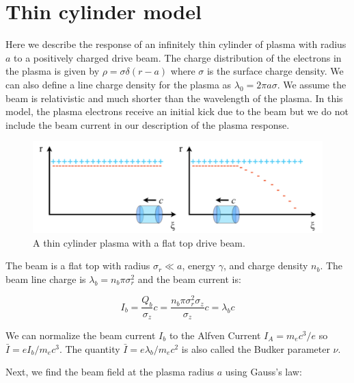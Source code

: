 \documentclass[aps,prl,preprint,groupedaddress]{revtex4-1}
\begin{document}
\section{Thin cylinder model}

Here we describe the response of an infinitely thin cylinder of plasma with radius $a$ to a positively charged drive beam. The charge distribution of the electrons in the plasma is given by $\rho = \sigma \delta(r-a)$ where $\sigma$ is the surface charge density. We can also define a line charge density for the plasma as $\lambda_0 = 2\pi a \sigma$. We assume the beam is relativistic and much shorter than the wavelength of the plasma. In this model, the plasma electrons receive an initial kick due to the beam but we do not include the beam current in our description of the plasma response. 


\begin{figure}[ht]\label{fig:thin_cyl}
  \centering
    \includegraphics[width=150mm]{./figures/thin_cyl.pdf}
      \caption{A thin cylinder plasma with a flat top drive beam.}
\end{figure}

The beam is a flat top with radius $\sigma_r \ll a$, energy $\gamma$, and charge density $n_b$. The beam line charge is $\lambda_b = n_b \pi \sigma_r^2$ and the beam current is:

\begin{equation}\label{eq:I_beam}
I_b = \frac{Q_b}{\sigma_z}c = \frac{n_b \pi \sigma_r^2 \sigma_z}{\sigma_z}c = \lambda_b c
\end{equation}

We can normalize the beam current $I_b$ to the Alfven Current $I_A = m_e c^3/e$ so $\bar{I} = e I_b /m_e c^3$. The quantity $\bar{I} = e \lambda_b/m_e c^2$ is also called the Budker parameter $\nu$. 

Next, we find the beam field at the plasma radius $a$ using Gauss's law:
\end{document}
